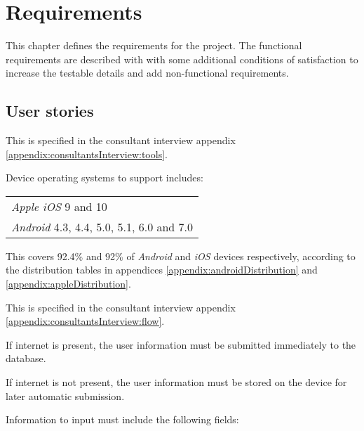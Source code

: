 \chapter{Requirements}\label{ch:Requirements}
This chapter defines the requirements for the project.
The functional requirements are described with  with some additional conditions of satisfaction to increase the testable details and add non-functional requirements.

\section*{User stories}


This  is specified in the consultant interview appendix \ref{appendix:consultantsInterview:tools}.

Device operating systems to support includes: \newline
\begin{tabularx}{\textwidth}{X}
    \textit{Apple iOS} 9 and 10 \\
    \textit{Android} 4.3, 4.4, 5.0, 5.1, 6.0 and 7.0
\end{tabularx}

This covers 92.4\% and 92\% of \textit{Android} and \textit{iOS} devices respectively, according to the distribution tables in appendices \ref{appendix:androidDistribution} and \ref{appendix:appleDistribution}.


This  is specified in the consultant interview appendix \ref{appendix:consultantsInterview:flow}.

If internet is present, the user information must be submitted immediately to the database.

If internet is not present, the user information must be stored on the device for later automatic submission.

Information to input must include the following fields:\newline
{}


